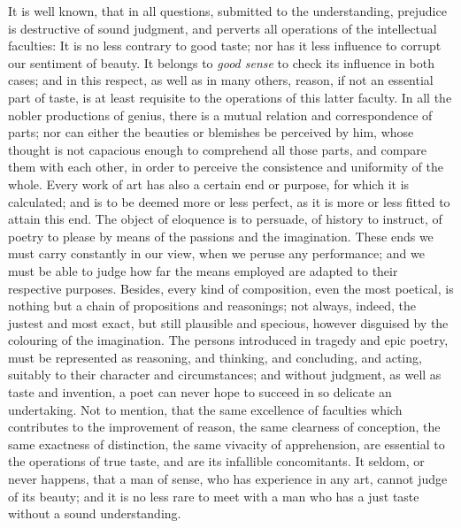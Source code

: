 It is well known, that in all questions, submitted to the
understanding, prejudice is destructive of sound judgment, and
perverts all operations of the intellectual faculties: It is no less
contrary to good taste; nor has it less influence to corrupt our
sentiment of beauty. It belongs to \textit{good sense} to check its
influence in both cases; and in this respect, as well as in many
others, reason, if not an essential part of taste, is at least
requisite to the operations of this latter faculty. In all the nobler
productions of genius, there is a mutual relation and correspondence
of parts; nor can either the beauties or blemishes be perceived by
him, whose thought is not capacious enough to comprehend all those
parts, and compare them with each other, in order to perceive the
consistence and uniformity of the whole. Every work of art has also a
certain end or purpose, for which it is calculated; and is to be
deemed more or less perfect, as it is more or less fitted to attain
this end. The object of eloquence is to persuade, of history to
instruct, of poetry to please by means of the passions and the
imagination. These ends we must carry constantly in our view, when we
peruse any performance; and we must be able to judge how far the means
employed are adapted to their respective purposes. Besides, every kind
of composition, even the most poetical, is nothing but a chain of
propositions and reasonings; not always, indeed, the justest and most
exact, but still plausible and specious,  however disguised
by the colouring of the imagination. The persons introduced in tragedy
and epic poetry, must be represented as reasoning, and thinking, and
concluding, and acting, suitably to their character and circumstances;
and without judgment, as well as taste and invention, a poet can never
hope to succeed in so delicate an undertaking. Not to mention, that
the same excellence of faculties which contributes to the improvement
of reason, the same clearness of conception, the same exactness of
distinction, the same vivacity of apprehension, are essential to the
operations of true taste, and are its infallible concomitants. It
seldom, or never happens, that a man of sense, who has experience in
any art, cannot judge of its beauty; and it is no less rare to meet
with a man who has a just taste without a sound understanding.

